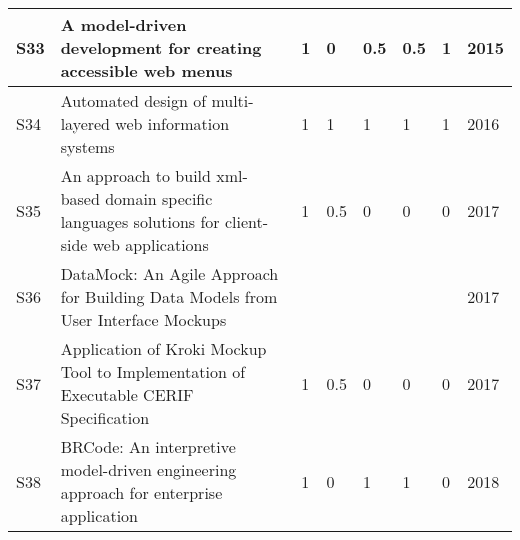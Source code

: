\begin{table*}[ht!]
\begin{tabular}{ | p{0.3cm} | p{10.0cm} | p{0.7cm} |  p{0.7cm} | p{0.7cm} | p{0.7cm} | p{0.7cm}| p{0.7cm}|}
S33 &  A model-driven development for creating accessible web menus~\cite{antonelli2015model}  &1  &0 &0.5 & 0.5 & 1 & 2015 \\ \hline

S34 &  Automated design of multi-layered web information systems~\cite{Basso16JSS}  & 1 & 1 & 1 & 1 & 1  & 2016 \\ \hline

S35 &  An approach to build xml-based domain specific languages solutions for client-side web applications~\cite{chavarriaga2017approach}  & 1 & 0.5 & 0 & 0 & 0 & 2017 \\ \hline


S36 &  DataMock: An Agile Approach for Building Data Models from User Interface Mockups~\cite{Rivero2017}  &  & & & & & 2017 \\ \hline

S37 &  Application of Kroki Mockup Tool to Implementation of Executable CERIF Specification~\cite{FILIPOVIC2017245}  & 1 & 0.5 & 0 & 0 & 0  & 2017 \\ \hline

S38 &  BRCode: An interpretive model-driven engineering approach for enterprise application~\cite{OLIVEIRA201886}  & 1 & 0 & 1 & 1 & 0 & 2018 \\ \hline

\end{tabular}

\label{table:npapers} 
\end{table*}
